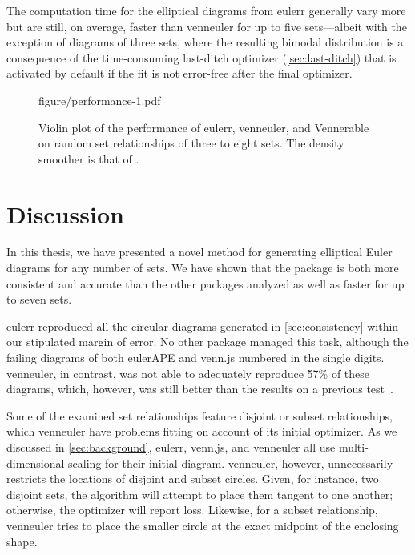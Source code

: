 \documentclass[
  oneside,
  openany,
  numbers=noendperiod,
  parskip=half,
  bibliography=totoc
]{scrbook}\usepackage[]{graphicx}\usepackage{xcolor}
\newcommand{\pkg}[1]{{\fontseries{b}\selectfont #1}}
\begin{document}
The computation time for the elliptical
diagrams from \pkg{eulerr} generally vary more but are still, on average,
faster than \pkg{venneuler} for up to five sets---albeit with the exception
of diagrams of three sets, where the resulting bimodal distribution is a
consequence of the time-consuming
last-ditch optimizer (\cref{sec:last-ditch}) that is activated by default
if the fit is not error-free after the final optimizer.

\begin{figure}[hbtp]
figure/performance-1.pdf
\caption{Violin plot of the performance of \pkg{eulerr}, \pkg{venneuler}, and \pkg{Vennerable} on
random set relationships of three to eight sets. The density smoother is that of \citet{Sheather_1991}.}
\label{fig:performance}
\end{figure}

\chapter{Discussion}
\label{ch:discussion}

In this thesis, we have presented a novel method for generating elliptical Euler diagrams
for any number of sets. We have shown that the package
is both more consistent and accurate than the other packages analyzed as well as
faster for up to seven sets.

\pkg{eulerr} reproduced all the circular diagrams
generated in \cref{sec:consistency} within our stipulated margin of error.
No other package managed this task, although the failing diagrams of both
\pkg{eulerAPE} and \pkg{venn.js} numbered in the single digits.
\pkg{venneuler}, in contrast, was not able to adequately
reproduce 57\%
of these diagrams, which, however, was still
better than the results on a previous
test~\citep{Frederickson_2015b}.

Some of the examined set relationships feature disjoint or subset
relationships, which \pkg{venneuler} have problems fitting on account of its
initial optimizer. As we discussed in \cref{sec:background},
\pkg{eulerr}, \pkg{venn.js}, and \pkg{venneuler} all use multi-dimensional scaling for
their initial diagram. \pkg{venneuler}, however, unnecessarily restricts the
locations of disjoint and subset circles. Given, for instance, two disjoint
sets, the algorithm will attempt to place them tangent to one another; otherwise,
the optimizer will report loss. Likewise, for a subset
relationship, \pkg{venneuler} tries to place the smaller circle at the exact
midpoint of the enclosing shape.
\end{document}
